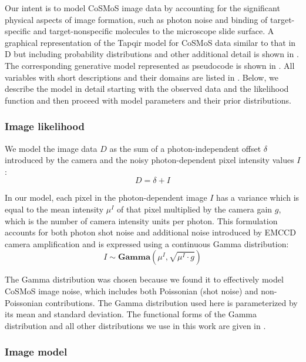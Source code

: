 Our intent is to model CoSMoS image data by accounting for the significant physical aspects of image formation, such as photon noise and binding of target-specific and target-nonspecific molecules to the microscope slide surface. A graphical representation of the Tapqir model for CoSMoS data similar to that in D but including probability distributions and other additional detail is shown in . The corresponding generative model represented as pseudocode is shown in . All variables with short descriptions and their domains are listed in . Below, we describe the model in detail starting with the observed data and the likelihood function and then proceed with model parameters and their prior distributions.

\subsubsection{Image likelihood}

We model the image data $D$ as the sum of a photon-independent offset $\delta$ introduced by the camera and the noisy photon-dependent pixel intensity values $I$:
%
\begin{equation}
    D = \delta + I
\end{equation}

In our model, each pixel in the photon-dependent image $I$ has a  variance which is equal to  the mean intensity $\mu^I$ of that pixel multiplied by the camera gain $g$, which is the number of camera intensity units per photon. This formulation accounts for both photon shot noise and additional noise introduced by EMCCD camera amplification \citep{Van_Vliet1998-jk} and is expressed using a continuous Gamma distribution:
%
\begin{equation}
    I \sim \mathbf{Gamma} (\mu^I, \sqrt{\mu^I \cdot g})
\end{equation}

The Gamma distribution was chosen because we found it to effectively model CoSMoS image noise, which includes both Poissonian (shot noise) and non-Poissonian contributions. The Gamma distribution used here is parameterized by its mean and standard deviation. The functional forms of the Gamma distribution and all other distributions we use in this work are given in .

\subsubsection{Image model}

